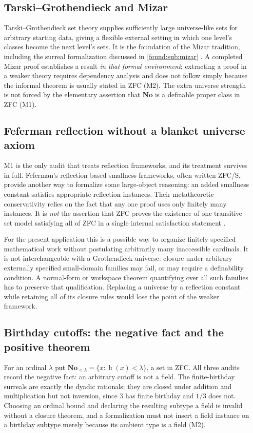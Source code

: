 \documentclass[11pt,letterpaper]{article}
\numberwithin{equation}{section}
\theoremstyle{definition}
\theoremstyle{remark}
\newcommand{\No}{\mathbf{No}}
\newcommand{\bd}{\operatorname{b}}
\begin{document}
\subsection{Tarski--Grothendieck and Mizar}
\label{found:sub:tg}
Tarski--Grothendieck set theory supplies sufficiently large universe-like sets
for arbitrary starting data, giving a flexible external setting in which one
level's classes become the next level's sets. It is the foundation of the Mizar
tradition, including the surreal formalization discussed in
\cref{found:sub:mizar} \cite{found:PakKaliszyk}. A completed Mizar proof
establishes a result \emph{in that formal environment}; extracting a proof in a
weaker theory requires dependency analysis and does not follow simply because
the informal theorem is usually stated in ZFC (M2). The extra universe strength
is not forced by the elementary assertion that $\No$ is a definable proper class
in ZFC (M1).

\subsection{Feferman reflection without a blanket universe axiom}
\label{found:sub:reflection}
M1 is the only audit that treats reflection frameworks, and its treatment
survives in full. Feferman's reflection-based smallness frameworks, often
written ZFC/S, provide another way to formalize some large-object reasoning: an
added smallness constant satisfies appropriate reflection instances. Their
metatheoretic conservativity relies on the fact that any one proof uses only
finitely many instances. It is \emph{not} the assertion that ZFC proves the
existence of one transitive set model satisfying all of ZFC in a single
internal satisfaction statement \cite[\S11]{found:ShulmanSize}.

For the present application this is a possible way to organize finitely
specified mathematical work without postulating arbitrarily many inaccessible
cardinals. It is not interchangeable with a Grothendieck universe: closure under
arbitrary externally specified small-domain families may fail, or may require a
definability condition. A normal-form or workspace theorem quantifying over all
such families has to preserve that qualification. Replacing a universe by a
reflection constant while retaining all of its closure rules would lose the
point of the weaker framework.

\subsection{Birthday cutoffs: the negative fact and the positive theorem}
\label{found:sub:cutoffs}
For an ordinal $\lambda$ put $\No_{<\lambda}=\{x:\bd(x)<\lambda\}$, a set in
ZFC. All three audits record the negative fact: an arbitrary cutoff is not a
field. The finite-birthday surreals are exactly the dyadic rationals; they are
closed under addition and multiplication but not inversion, since $3$ has finite
birthday and $1/3$ does not. Choosing an ordinal bound and declaring the
resulting subtype a field is invalid without a closure theorem, and a
formalization must not insert a field instance on a birthday subtype merely
because its ambient type is a field (M2).
\end{document}

